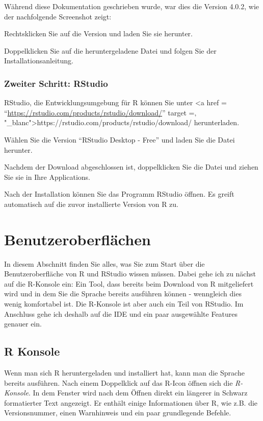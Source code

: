 \documentclass[
]{book}
\begin{document}
Während diese Dokumentation geschrieben wurde, war dies die Version 4.0.2, wie der nachfolgende Screenshot zeigt:

Rechtsklicken Sie auf die Version und laden Sie sie herunter.

Doppelklicken Sie auf die heruntergeladene Datei und folgen Sie der Installationsanleitung.

\hypertarget{zweiter-schritt-rstudio-1}{%
\subsection{Zweiter Schritt: RStudio}\label{zweiter-schritt-rstudio-1}}

RStudio, die Entwicklungsumgebung für R können Sie unter \textless a href = ``\url{https://rstudio.com/products/rstudio/download/}'' target =‚ "\_blanc"\textgreater https://rstudio.com/products/rstudio/download/ herunterladen.

Wählen Sie die Version ``RStudio Desktop - Free'' und laden Sie die Datei herunter.

Nachdem der Download abgeschlossen ist, doppelklicken Sie die Datei und ziehen Sie sie in Ihre Applications.

Nach der Installation können Sie das Programm RStudio öffnen. Es greift automatisch auf die zuvor installierte Version von R zu.

\hypertarget{benutzeroberfluxe4chen}{%
\chapter{Benutzeroberflächen}\label{benutzeroberfluxe4chen}}

In diesem Abschnitt finden Sie alles, was Sie zum Start über die Benutzeroberfläche von R und RStudio wissen müssen. Dabei gehe ich zu nächst auf die R-Konsole ein: Ein Tool, dass bereits beim Download von R mitgeliefert wird und in dem Sie die Sprache bereits ausführen können - wenngleich dies wenig komfortabel ist. Die R-Konsole ist aber auch ein Teil von RStudio. Im Anschluss gehe ich deshalb auf die IDE und ein paar ausgewählte Features genauer ein.

\hypertarget{konsole}{%
\section{R Konsole}\label{konsole}}

Wenn man sich R heruntergeladen und installiert hat, kann man die Sprache bereits ausführen.
Nach einem Doppelklick auf das R-Icon öffnen sich die \emph{R-Konsole}.
In dem Fenster wird nach dem Öffnen direkt ein längerer in Schwarz formatierter Text angezeigt.
Er enthält einige Informationen über R, wie z.B. die Versionsnummer, einen Warnhinweis und ein paar grundlegende Befehle.
\end{document}
